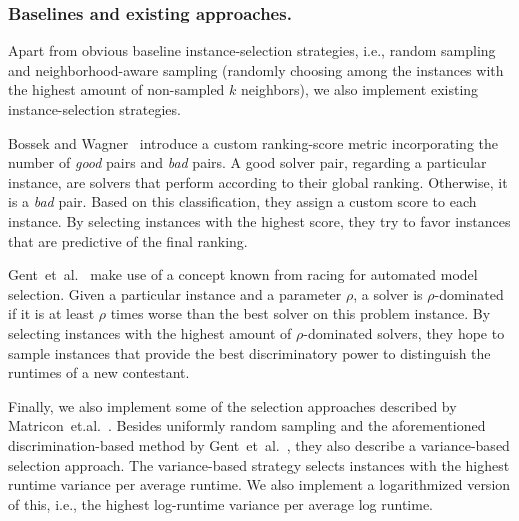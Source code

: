 \documentclass[runningheads]{llncs}
\begin{document}
\subsubsection{Baselines and existing approaches.}
\label{sec:sampling1}
Apart from obvious baseline instance-selection strategies, i.e., random sampling and neighborhood-aware sampling (randomly choosing among the instances with the highest amount of non-sampled $k$ neighbors), we also implement existing instance-selection strategies.

Bossek and Wagner~\cite{Bossek021a} introduce a custom ranking-score metric incorporating the number of \emph{good} pairs and \emph{bad} pairs.
A good solver pair, regarding a particular instance, are solvers that perform according to their global ranking.
Otherwise, it is a \emph{bad} pair.
Based on this classification, they assign a custom score to each instance.
By selecting instances with the highest score, they try to favor instances that are predictive of the final ranking.

Gent~et~al.~\cite{GentHJKMNN14} make use of a concept known from racing for automated model selection.
Given a particular instance and a parameter $\rho$, a solver is $\rho$-dominated if it is at least $\rho$ times worse than the best solver on this problem instance.
By selecting instances with the highest amount of $\rho$-dominated solvers, they hope to sample instances that provide the best discriminatory power to distinguish the runtimes of a new contestant.

Finally, we also implement some of the selection approaches described by Matricon~et.al.~\cite{MatriconAFSH21}.
Besides uniformly random sampling and the aforementioned discrimination-based method by Gent~et~al.~\cite{GentHJKMNN14}, they also describe a variance-based selection approach.
The variance-based strategy selects instances with the highest runtime variance per average runtime.
We also implement a logarithmized version of this, i.e., the highest log-runtime variance per average log runtime.
 
\end{document}
